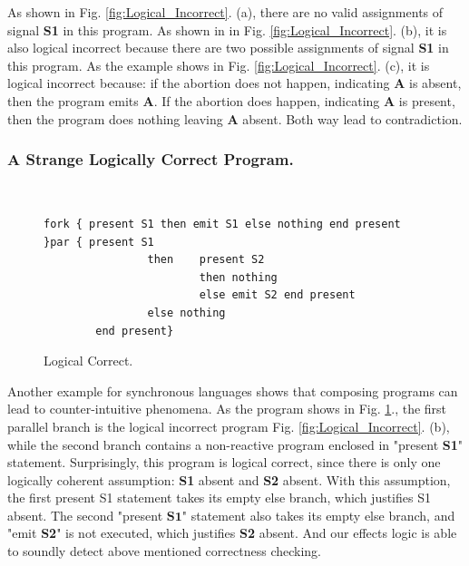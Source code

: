 \documentclass[acmsmall,review,anonymous]{acmart}\settopmatter{printfolios=true,printccs=false,printacmref=false}
\newcommand{\code}[1]{{\tt{\ensuremath{\m{#1}}}}}
\newcommand{\m}{\mathit}
\newcommand\figref[1]{Fig. \textcolor{black}{\ref{#1}}.}
\begin{document}
As shown in \figref{fig:Logical_Incorrect} (a), there are no valid assignments of signal {\textbf{S1}} in this program. 
As shown in in \figref{fig:Logical_Incorrect} (b), it is also logical incorrect because there are two possible assignments of signal {\textbf{S1}} in this program. 
As the example shows in \figref{fig:Logical_Incorrect} (c), it is logical incorrect because: if the abortion does not happen, indicating {\textbf{A}} is absent, then the program emits {\textbf{A}}. If the abortion does happen, indicating {\textbf{A}} is present, then the program does nothing leaving {\textbf{A}} absent. Both way lead to contradiction. 



\subsubsection{A Strange Logically Correct Program.}~\\


\begin{figure}
      \vspace{-6mm}
\begin{lstlisting}[columns=fullflexible]
fork { present S1 then emit S1 else nothing end present
}par { present S1 
				then	present S2 
						then nothing 
						else emit S2 end present 
				else nothing 
		end present}        
\end{lstlisting}  
      \vspace{-1mm}
      \caption{Logical Correct.}\label{fig:A_Strange}
         \vspace{-2mm}
\end{figure}

      \vspace{-2mm}
Another example for synchronous languages shows that composing programs can lead to counter-intuitive phenomena. As the program shows in \figref{fig:A_Strange}, 
the first parallel branch is the logical incorrect program \figref{fig:Logical_Incorrect} (b), while the second branch contains a non-reactive program enclosed in  "present {\textbf{S1}}" statement. Surprisingly, this program is logical correct, since there is only one logically coherent assumption: {\textbf{S1}} absent and {\textbf{S2}}  absent. With this assumption, the first present {{S1}}  statement takes its empty else branch, which justifies {{S1}}  absent. The second "present \code{\textbf{S1}}" statement also takes its empty else branch, and "emit {\textbf{S2}}" is not executed, which justifies {\textbf{S2}}  absent. And our effects logic is able to soundly detect above mentioned correctness checking. 
\end{document}
